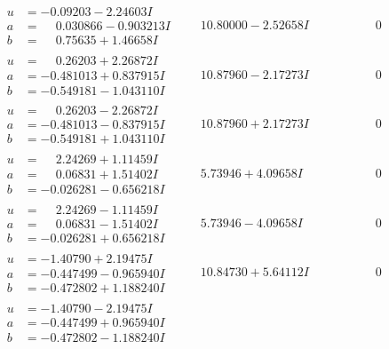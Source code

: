 \documentclass[1p]{elsarticle_modified}
\theoremstyle{definition}
\begin{document}
$$\begin{array}{c|c|c}
\begin{aligned}
u &= -0.09203 - 2.24603 I \\
a &= \phantom{-}0.030866 - 0.903213 I \\
b &= \phantom{-}0.75635 + 1.46658 I\end{aligned}
 & \phantom{-}10.80000 - 2.52658 I & \phantom{-0.000000 } 0 \\ \hline\begin{aligned}
u &= \phantom{-}0.26203 + 2.26872 I \\
a &= -0.481013 + 0.837915 I \\
b &= -0.549181 - 1.043110 I\end{aligned}
 & \phantom{-}10.87960 - 2.17273 I & \phantom{-0.000000 } 0 \\ \hline\begin{aligned}
u &= \phantom{-}0.26203 - 2.26872 I \\
a &= -0.481013 - 0.837915 I \\
b &= -0.549181 + 1.043110 I\end{aligned}
 & \phantom{-}10.87960 + 2.17273 I & \phantom{-0.000000 } 0 \\ \hline\begin{aligned}
u &= \phantom{-}2.24269 + 1.11459 I \\
a &= \phantom{-}0.06831 + 1.51402 I \\
b &= -0.026281 - 0.656218 I\end{aligned}
 & \phantom{-}5.73946 + 4.09658 I & \phantom{-0.000000 } 0 \\ \hline\begin{aligned}
u &= \phantom{-}2.24269 - 1.11459 I \\
a &= \phantom{-}0.06831 - 1.51402 I \\
b &= -0.026281 + 0.656218 I\end{aligned}
 & \phantom{-}5.73946 - 4.09658 I & \phantom{-0.000000 } 0 \\ \hline\begin{aligned}
u &= -1.40790 + 2.19475 I \\
a &= -0.447499 - 0.965940 I \\
b &= -0.472802 + 1.188240 I\end{aligned}
 & \phantom{-}10.84730 + 5.64112 I & \phantom{-0.000000 } 0 \\ \hline\begin{aligned}
u &= -1.40790 - 2.19475 I \\
a &= -0.447499 + 0.965940 I \\
b &= -0.472802 - 1.188240 I\end{aligned}

\end{array}$$
\end{document}

